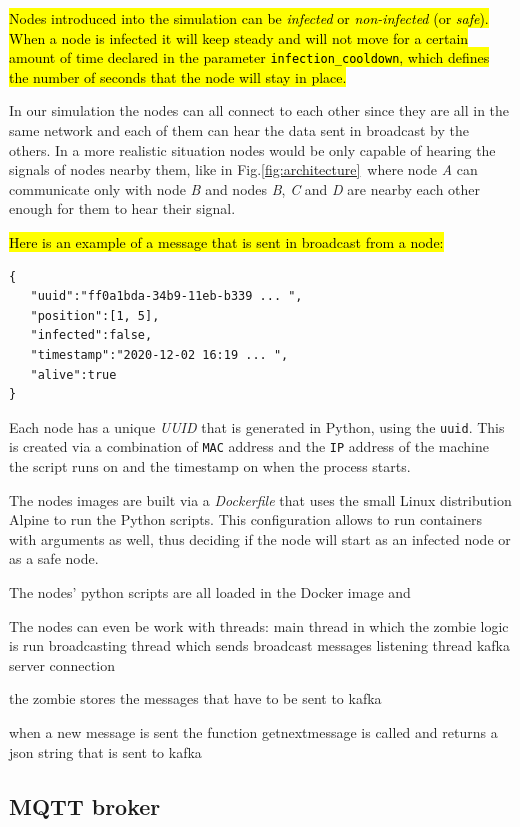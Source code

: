 \documentclass[conference]{IEEEtran}
\begin{document}
		\hl{Nodes introduced into the simulation can be \textit{infected} or \textit{non-infected} (or \textit{safe}).
		When a node is infected it will keep steady and will not move for a certain amount of time declared in the parameter \texttt{infection\_cooldown}, which defines the number of seconds that the node will stay in place.}
		
		In our simulation the nodes can all connect to each other since they are all in the same network and each of them can hear the data sent in broadcast by the others.
		In a more realistic situation nodes would be only capable of hearing the signals of nodes nearby them, like in Fig.\ref{fig:architecture}~where node \textit{A} can communicate only with node \textit{B} and nodes \textit{B}, \textit{C} and \textit{D} are nearby each other enough for them to hear their signal.

		\hl{Here is an example of a message that is sent in broadcast from a node:}
		\begin{verbatim}
{  
   "uuid":"ff0a1bda-34b9-11eb-b339 ... ",
   "position":[1, 5],
   "infected":false,
   "timestamp":"2020-12-02 16:19 ... ",
   "alive":true
}  
		\end{verbatim}
		
		Each node has a unique \textit{UUID} that is generated in Python, using the \texttt{uuid}\cite{uuid}.
		This is created via a combination of \texttt{MAC} address and the \texttt{IP} address of the machine the script runs on and the timestamp on when the process starts.

		The nodes images are built via a \textit{Dockerfile} that uses the small Linux distribution Alpine to run the Python scripts.
		This configuration allows to run containers with arguments as well, thus deciding if the node will start as an infected node or as a safe node.
	
		The nodes' python scripts are all loaded in the Docker image and
	
		The nodes can even be  work with threads:
		main thread in which the zombie logic is run
		broadcasting thread which sends broadcast messages
		listening thread
		kafka server connection
		
		the zombie stores the messages that have to be sent to kafka
		
		when a new message is sent the function getnextmessage is called and returns a json string that is sent to kafka

	\subsection{MQTT broker}	
	
\end{document}
